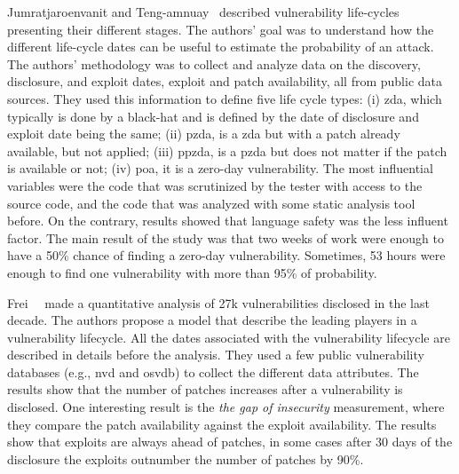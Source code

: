 Jumratjaroenvanit and Teng-amnuay~\cite{Jumratjaroenvanit:2008} described vulnerability life-cycles presenting their different stages. 
The authors' goal was to understand how the different life-cycle dates can be useful to estimate the probability of an attack. 
The authors' methodology was to collect and analyze data on the discovery, disclosure, and exploit dates, exploit and patch availability, all from public data sources. 
They used this information to define five life cycle types: (i) \gls{zda}, which typically is done by a black-hat and is defined by the date of disclosure and exploit date being the same; (ii) \gls{pzda}, is a \gls{zda} but with a patch already available, but not applied; 
(iii) \gls{ppzda}, is a \gls{pzda} but does not matter if the patch is available or not; 
(iv) \gls{poa}, it is a zero-day vulnerability. 
The most influential variables were the code that was scrutinized by the tester with access to the source code, and the code that was analyzed with some static analysis tool before. 
On the contrary, results showed that language safety was the less influent factor. 
The main result of the study was that two weeks of work were enough to have a 50\% chance of finding a zero-day vulnerability. 
Sometimes, 53 hours were enough to find one vulnerability with more than 95\% of probability.


Frei~\etal{}~\cite{Frei:2010} made a quantitative analysis of 27k vulnerabilities disclosed in the last decade.
The authors propose a model that describe the leading players in a vulnerability lifecycle.
All the dates associated with the vulnerability lifecycle are described in details before the analysis.
They used a few public vulnerability databases (e.g., \gls{nvd} and \gls{osvdb}) to collect the different data attributes.
The results show that the number of patches increases after a vulnerability is disclosed.  
One interesting result is the \emph{the gap of insecurity} measurement, where they compare the patch availability against the exploit availability. 
The results show that exploits are always ahead of patches, in some cases after 30 days of the disclosure the exploits outnumber the number of patches by 90\%.


